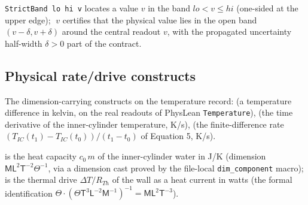 \begin{definition}
\label{def:IPhO2026Problems_problem_IPhO_2026_4_C_6:StrictBand}
\texttt{StrictBand lo hi v} locates a value $v$ in the band
$lo < v \le hi$ (one-sided at the upper edge);
 $\;v$ certifies that the physical value
lies in the open band $(v - \delta, v + \delta)$ around the central readout
$v$, with the propagated uncertainty half-width $\delta > 0$ part of the
contract.
\end{definition}

\subsection*{Physical rate/drive constructs}

\begin{definition}
\label{def:IPhO2026Problems_problem_IPhO_2026_4_C_6:tempDiffSI}
The dimension-carrying constructs on the temperature record:
 (a temperature difference in kelvin, on the
real readouts of PhysLean \texttt{Temperature}),
 (the time derivative of the
inner-cylinder temperature, K/s),
 (the finite-difference rate
$(T_{IC}(t_1) - T_{IC}(t_0))/(t_1 - t_0)$ of Equation 5, K/s).
\end{definition}

\begin{definition}
\label{def:IPhO2026Problems_problem_IPhO_2026_4_C_6:innerHeatCapacitySI}
 is the heat capacity $c_0\,m$ of
the inner-cylinder water in J/K (dimension
$\mathsf{M}\mathsf{L}^2\mathsf{T}^{-2}\Theta^{-1}$, via a dimension cast
proved by the file-local \texttt{dim\_component} macro);
 is the thermal drive $\Delta T / R_{Th}$ of
the wall as a heat current in watts (the formal identification
$\Theta\cdot(\Theta\mathsf{T}^3\mathsf{L}^{-2}\mathsf{M}^{-1})^{-1} = \mathsf{M}\mathsf{L}^2\mathsf{T}^{-3}$).
\end{definition}

